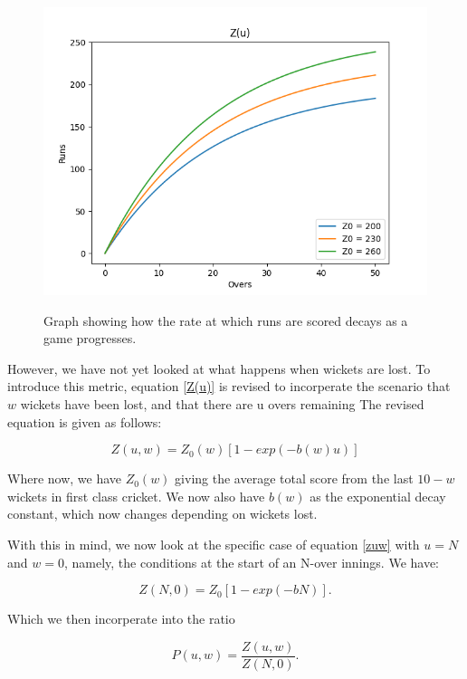 \begin{figure}[h]
    \centering
    \includegraphics[scale=0.6]{figures/z(u).png}
    \label{Zugraph}
    \caption{Graph showing how the rate at which runs are scored decays as a game progresses.}
\end{figure}

However, we have not yet looked at what happens when wickets are lost. To introduce this metric, equation \ref{Z(u)}
is revised to incorperate the scenario that $w$ wickets have been lost, and that there are u overs remaining
The revised equation is given as follows:

\begin{equation}
    Z(u,w) = Z_0(w)[1-exp(-b(w)u)]
    \label{zuw}
\end{equation}

Where now, we have $Z_0(w)$ giving the average total score from the last $10-w$ wickets in first class cricket.
We now also have $b(w)$ as the exponential decay constant, which now changes depending on wickets lost.

With this in mind, we now look at the specific case of equation \ref{zuw} with $u=N$ and $w=0$, namely, the conditions
at the start of an N-over innings. We have:

\begin{equation}
    Z(N,0) = Z_0[1-exp(-bN)].
    \label{zstart}
\end{equation}

Which we then incorperate into the ratio

\begin{equation}
    P(u,w) = \frac{Z(u,w)}{Z(N,0)}.
    \label{prat}
\end{equation}

